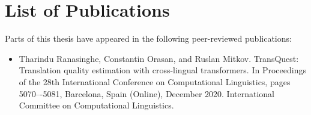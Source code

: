
\chapter*{List of Publications}

Parts of this thesis have appeared in the following peer-reviewed publications:

\begin{itemize}
	\item Tharindu Ranasinghe, Constantin Orasan, and Ruslan Mitkov. TransQuest: Translation quality estimation with cross-lingual transformers. In Proceedings of the 28th International Conference on Computational Linguistics, pages 5070–-5081, Barcelona, Spain (Online), December 2020. International Committee on Computational Linguistics.
\end{itemize}
